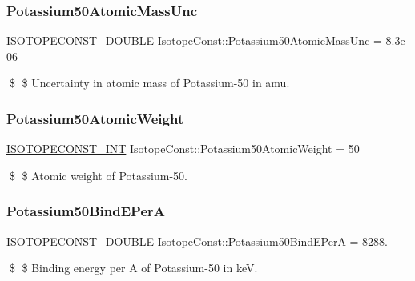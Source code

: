 \subsubsection{\texorpdfstring{Potassium50\+Atomic\+Mass\+Unc}{Potassium50AtomicMassUnc}}
{\footnotesize\ttfamily \mbox{\hyperlink{group___isotope_const-_macros_ga8f45a7272ce02c0b4c65c44636ed719a}{I\+S\+O\+T\+O\+P\+E\+C\+O\+N\+S\+T\+\_\+\+D\+O\+U\+B\+LE}} Isotope\+Const\+::\+Potassium50\+Atomic\+Mass\+Unc = 8.\+3e-\/06}

\$ \$ Uncertainty in atomic mass of Potassium-\/50 in amu. \mbox{\label{group___isotope_const-_potassium-_k50_gaa6e7a8c898d26c93c1e9c435960cf48e}} 
\subsubsection{\texorpdfstring{Potassium50\+Atomic\+Weight}{Potassium50AtomicWeight}}
{\footnotesize\ttfamily \mbox{\hyperlink{group___isotope_const-_macros_ga5f18360b3e99483a35c32d789e62621c}{I\+S\+O\+T\+O\+P\+E\+C\+O\+N\+S\+T\+\_\+\+I\+NT}} Isotope\+Const\+::\+Potassium50\+Atomic\+Weight = 50}

\$ \$ Atomic weight of Potassium-\/50. \mbox{\label{group___isotope_const-_potassium-_k50_ga8ca0f859616debbbff4a9ab97db72940}} 
\subsubsection{\texorpdfstring{Potassium50\+Bind\+E\+PerA}{Potassium50BindEPerA}}
{\footnotesize\ttfamily \mbox{\hyperlink{group___isotope_const-_macros_ga8f45a7272ce02c0b4c65c44636ed719a}{I\+S\+O\+T\+O\+P\+E\+C\+O\+N\+S\+T\+\_\+\+D\+O\+U\+B\+LE}} Isotope\+Const\+::\+Potassium50\+Bind\+E\+PerA = 8288.}

\$ \$ Binding energy per A of Potassium-\/50 in keV. \mbox{\label{group___isotope_const-_potassium-_k50_ga1252ff5f8aee218b773b3b86372ce047}} 
